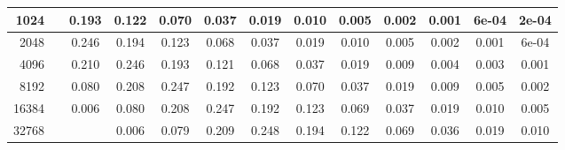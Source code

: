 \begin{appendices}
\begin{table}[H]
{\begin{tabular}{r|cccccccccccc}
1024 &&0.193 &0.122 &0.070 &0.037 &0.019 &0.010 &0.005 &0.002 &0.001 &6e-04 &2e-04\\\hline

2048 &&0.246 &0.194 &0.123 &0.068 &0.037 &0.019 &0.010 &0.005 &0.002 &0.001 &6e-04\\\hline

4096 &&0.210 &0.246 &0.193 &0.121 &0.068 &0.037 &0.019 &0.009 &0.004 &0.003 &0.001\\\hline

8192 &&0.080 &0.208 &0.247 &0.192 &0.123 &0.070 &0.037 &0.019 &0.009 &0.005 &0.002\\\hline

16384 &&0.006 &0.080 &0.208 &0.247 &0.192 &0.123 &0.069 &0.037 &0.019 &0.010 &0.005\\\hline

32768 &&&0.006 &0.079 &0.209 &0.248 &0.194 &0.122 &0.069 &0.036 &0.019 &0.010\\\hline

\end{tabular}
}

\end{table}
\begin{table}[H]\ContinuedFloat
\caption[]{Experimentally computed CBT Estimate Distributon. Table 3/3}
\end{table}
\end{appendices}
